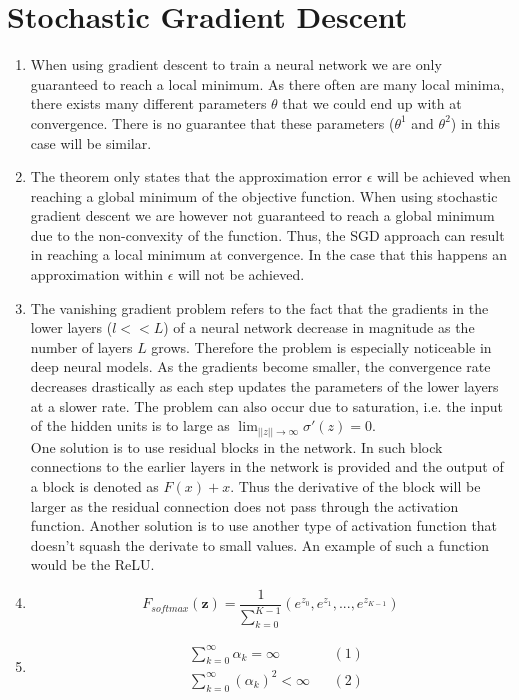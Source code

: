 \documentclass{article}
\begin{document}
\section{Stochastic Gradient Descent}
\begin{enumerate}[label=(\alph*)]
	\item When using gradient descent to train a neural network we are only guaranteed to reach a local minimum. As there often are many local minima, there exists many different parameters $\theta$ that we could end up with at convergence. There is no guarantee that these parameters ($\theta^1$ and $\theta^2$) in this case will be similar. 
	\item The theorem only states that the approximation error $\epsilon$ will be achieved when reaching a global minimum of the objective function. When using stochastic gradient descent we are however not guaranteed to reach a global minimum due to the non-convexity of the function. Thus, the SGD approach can result in reaching a local minimum at convergence. In the case that this happens an approximation within $\epsilon$ will not be achieved. 
	\item  The vanishing gradient problem refers to the fact that the gradients in the lower layers ($l<< L$) of a neural network decrease in magnitude as the number of layers $L$ grows. Therefore the problem is especially noticeable in deep neural models. As the gradients become smaller, the convergence rate decreases drastically as each step updates the parameters of the lower layers at a slower rate. The problem can also occur due to saturation, i.e. the input of the hidden units is to large as $\lim_{||z|| \rightarrow \infty} \sigma'(z) = 0$. \\ One solution is to use residual blocks in the network. In such block connections to the earlier layers in the network is provided and the output of a block is denoted as $F(x) + x$. Thus the derivative of the block will be larger as the residual connection does not pass through the activation function. Another solution is to use another type of activation function that doesn't squash the derivate to small values. An example of such a function would be the ReLU.
	\item $$F_{softmax}(\mathbf{z}) = \frac{1}{\sum_{k=0}^{K-1}}\left(e^{z_0}, e^{z_1}, ..., e^{z_{K-1}}\right)$$
	\item \begin{align*}
		&\sum_{k=0}^{\infty} \alpha_k = \infty && (1)\\
		&\sum_{k=0}^{\infty} \left(\alpha_k \right)^2 < \infty && (2)

\end{align*}
\end{enumerate}
\end{document}
